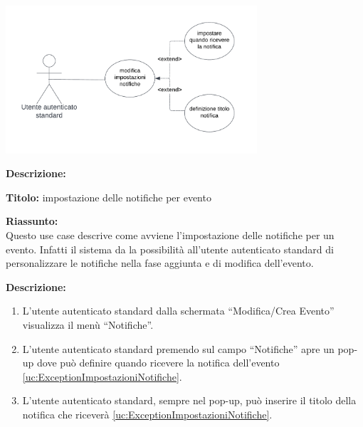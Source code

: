 \begin{listaPersonale}[UC]{}





    \newpage


    \begin{center}
        \includegraphics[width=0.7\textwidth]{img/Diagrammi/UseCases/Notifiche.png}
    \end{center}

    \textbf{Descrizione:}

    \textbf{Titolo:} impostazione delle notifiche per evento

    \textbf{Riassunto:} \\
    Questo use case descrive come avviene l'impostazione delle notifiche per un evento. Infatti il sistema da la possibilità all'utente autenticato standard di personalizzare le notifiche nella fase aggiunta e di modifica dell'evento.

    \textbf{Descrizione:}
    \begin{enumerate}
        \item L'utente autenticato standard dalla schermata “Modifica/Crea Evento” visualizza il menù “Notifiche”.
        \item L'utente autenticato standard premendo sul campo “Notifiche” apre un pop-up dove può definire quando ricevere la notifica dell'evento \ref{uc:ExceptionImpostazioniNotifiche}.
        \item L'utente autenticato standard, sempre nel pop-up, può inserire il titolo della notifica che riceverà \ref{uc:ExceptionImpostazioniNotifiche}.
    \end{enumerate}


\end{listaPersonale}
